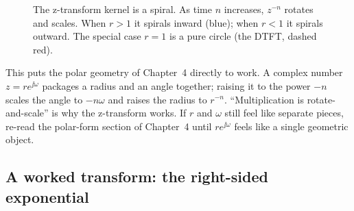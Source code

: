 \begin{figure}[H]
\centering
{}
\caption{The z-transform kernel is a spiral. As time $n$ increases, $z^{-n}$ rotates and scales. When $r>1$ it spirals inward (blue); when $r<1$ it spirals outward. The special case $r=1$ is a pure circle (the DTFT, dashed red).}
\label{ch15:fig-spiral}
\end{figure}


\begin{connectionbox}
This puts the polar geometry of Chapter~4 directly to work. A complex number $z=re^{\jj\omega}$
packages a radius and an angle together; raising it to the power $-n$ scales the angle to
$-n\omega$ and raises the radius to $r^{-n}$. ``Multiplication is rotate-and-scale'' is why
the z-transform works. If $r$ and $\omega$ still feel like separate pieces, re-read the
polar-form section of Chapter~4 until $re^{\jj\omega}$ feels like a single geometric object.
\end{connectionbox}

\subsection{A worked transform: the right-sided exponential}

